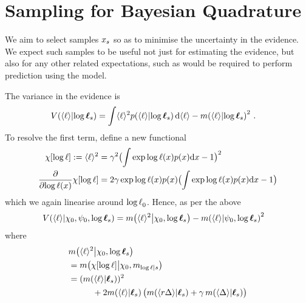\documentclass{article}
\begin{document}
\section{Sampling for Bayesian Quadrature}

We aim to select samples $\lfv_s$ so as to minimise the uncertainty in the evidence. We expect such samples to be useful not just for estimating the evidence, but also for any other related expectations, such as would be required to perform prediction using the model.

The variance in the evidence is
\begin{align*}
\cov{\inty{\lfn}}{\tvr_{s}}
& = \int \inty{\lfn}^2 \p{\inty{\lfn}}{\tvr_s} \ud\inty{\lfn}- \mean{\inty{\lfn}}{\tvr_s}^2\,.
\end{align*}
To resolve the first term, define a new functional
\begin{align*}
 \chi[\tr] \deq \inty{\lfn}^2 & = \gamma^2\bigl(\int  \exp \tr(\lfv) p(\lfv) \ud \lfv-1\bigr)^2\\
\pderiv{}{\tr(\lfv)}\chi[\tr] & = 2\gamma \exp \tr(\lfv) p(\lfv) \bigl(\int  \exp \tr(\lfv) p(\lfv) \ud \lfv-1\bigr)
\end{align*}
which we again linearise around $\tr_0$. Hence, as per the above
\begin{align*}
& \cov{\inty{\lfn}}{\chi_0,\psi_0,\tvr_{s}} = \mean{\inty{\lfn}^2}{\chi_0,\tvr_s} - \mean{\inty{\lfn}}{\psi_0,\tvr_s}^2
\end{align*}
where
\begin{align*}
&\mean{\inty{\lfn}^2}{\chi_0,\tvr_s} \\
& = \mean{\chi[\tr]}{\chi_0,m_{\tr|s}} \\
& = (\mean{\inty{\lfn}}{\vr_s})^2 \\
& \hspace{1cm} + 2\mean{\inty{\lfn}}{\vr_s}
\bigl(\mean{\inty{r \Delta}}{\vr_s} + \gamma\, \mean{\inty{\Delta}}{\vr_s}\bigr)
\end{align*}
\end{document}
